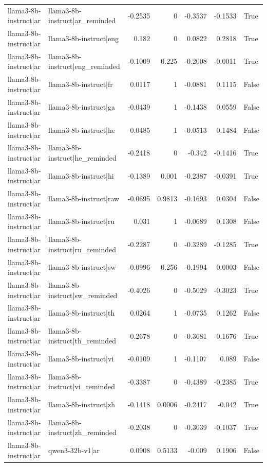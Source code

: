 \begin{table}
\begin{tabular}{l l r r r r l}
llama3-8b-instruct|ar & llama3-8b-instruct|ar_reminded & -0.2535 & 0 & -0.3537 & -0.1533 & True \\
llama3-8b-instruct|ar & llama3-8b-instruct|eng & 0.182 & 0 & 0.0822 & 0.2818 & True \\
llama3-8b-instruct|ar & llama3-8b-instruct|eng_reminded & -0.1009 & 0.225 & -0.2008 & -0.0011 & True \\
llama3-8b-instruct|ar & llama3-8b-instruct|fr & 0.0117 & 1 & -0.0881 & 0.1115 & False \\
llama3-8b-instruct|ar & llama3-8b-instruct|ga & -0.0439 & 1 & -0.1438 & 0.0559 & False \\
llama3-8b-instruct|ar & llama3-8b-instruct|he & 0.0485 & 1 & -0.0513 & 0.1484 & False \\
llama3-8b-instruct|ar & llama3-8b-instruct|he_reminded & -0.2418 & 0 & -0.342 & -0.1416 & True \\
llama3-8b-instruct|ar & llama3-8b-instruct|hi & -0.1389 & 0.001 & -0.2387 & -0.0391 & True \\
llama3-8b-instruct|ar & llama3-8b-instruct|raw & -0.0695 & 0.9813 & -0.1693 & 0.0304 & False \\
llama3-8b-instruct|ar & llama3-8b-instruct|ru & 0.031 & 1 & -0.0689 & 0.1308 & False \\
llama3-8b-instruct|ar & llama3-8b-instruct|ru_reminded & -0.2287 & 0 & -0.3289 & -0.1285 & True \\
llama3-8b-instruct|ar & llama3-8b-instruct|sw & -0.0996 & 0.256 & -0.1994 & 0.0003 & False \\
llama3-8b-instruct|ar & llama3-8b-instruct|sw_reminded & -0.4026 & 0 & -0.5029 & -0.3023 & True \\
llama3-8b-instruct|ar & llama3-8b-instruct|th & 0.0264 & 1 & -0.0735 & 0.1262 & False \\
llama3-8b-instruct|ar & llama3-8b-instruct|th_reminded & -0.2678 & 0 & -0.3681 & -0.1676 & True \\
llama3-8b-instruct|ar & llama3-8b-instruct|vi & -0.0109 & 1 & -0.1107 & 0.089 & False \\
llama3-8b-instruct|ar & llama3-8b-instruct|vi_reminded & -0.3387 & 0 & -0.4389 & -0.2385 & True \\
llama3-8b-instruct|ar & llama3-8b-instruct|zh & -0.1418 & 0.0006 & -0.2417 & -0.042 & True \\
llama3-8b-instruct|ar & llama3-8b-instruct|zh_reminded & -0.2038 & 0 & -0.3039 & -0.1037 & True \\
llama3-8b-instruct|ar & qwen3-32b-v1|ar & 0.0908 & 0.5133 & -0.009 & 0.1906 & False \\

\end{tabular}
\end{table}
